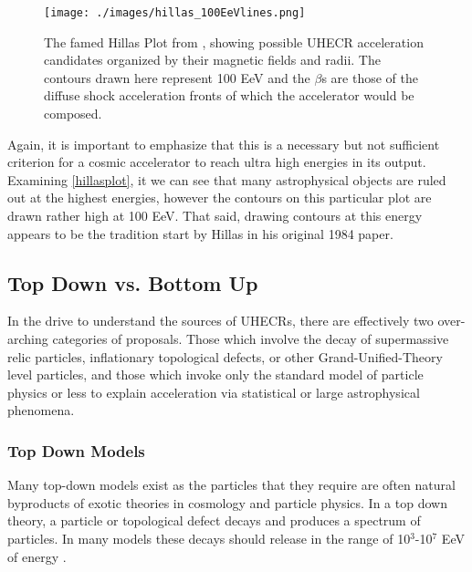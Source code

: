 \begin{figure}
\begin{center}
\texttt{[image: ./images/hillas\_100EeVlines.png]}
\caption{The famed Hillas Plot from \cite{stanev}, showing possible UHECR acceleration candidates organized by their magnetic fields and radii. The contours drawn here represent 100 EeV and the $\beta$s are those of the diffuse shock acceleration fronts of which the accelerator would be composed.}
\label{hillasplot}
\end{center}
\end{figure}
Again, it is important to emphasize that this is a necessary but not sufficient criterion for a cosmic accelerator to reach ultra high energies in its output. Examining \autoref{hillasplot}, it we can see that many astrophysical objects are ruled out at the highest energies, however the contours on this particular plot are drawn rather high at 100 EeV. That said, drawing contours at this energy appears to be the tradition start by Hillas in his original 1984 paper.
\subsection{Top Down vs. Bottom Up}%
In the drive to understand the sources of UHECRs, there are effectively two over-arching categories of proposals. Those which involve the decay of supermassive relic particles, inflationary topological defects, or other Grand-Unified-Theory level particles, and those which invoke only the standard model of particle physics or less to explain acceleration via statistical or large astrophysical phenomena. 
\subsubsection{Top Down Models}
Many top-down models exist as the particles that they require are often natural byproducts of exotic theories in cosmology and particle physics. In a top down theory, a particle or topological defect decays and produces a spectrum of particles. In many models these decays should release in the range of 10$^3$-10$^7$ EeV of energy \cite{stanev}. 


